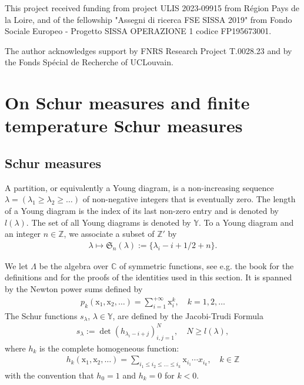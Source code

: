 \documentclass[12pt]{amsart}
\theoremstyle{definition}
\newcommand{\Z}{\mathbb{Z}}
\newcommand{\C}{\mathbb{C}}
\newcommand{\Y}{\mathbb{Y}}
\begin{document}
This project received funding from project ULIS 2023-09915 from R\'egion Pays de la Loire, and of the fellowship "Assegni di ricerca FSE SISSA 2019"  from Fondo Sociale Europeo - Progetto SISSA OPERAZIONE 1 codice FP195673001.

The author acknowledges support by FNRS Research Project T.0028.23 and by the Fonds Sp\'ecial de Recherche of UCLouvain.

\section{On Schur measures and finite temperature Schur measures} \label{section:schur}
\subsection{Schur measures}
A partition, or equivalently a Young diagram, is a non-increasing sequence $\lambda= (\lambda_1 \geq \lambda_2 \geq \dots)$ of non-negative integers that is eventually zero. The length of a Young diagram is the index of its last non-zero entry and is denoted by $l (\lambda)$. The set of all Young diagrams is denoted by $\Y$. To a Young diagram and an integer $n \in \Z$, we associate a subset of $\Z'$ by
\begin{align}
\lambda \mapsto \mathfrak{S}_n(\lambda) := \{ \lambda_i -i +1/2 + n \}.
\end{align}

We let $\Lambda$ be the algebra over $\C$ of symmetric functions, see e.g. the book \cite{macdonald} for the definitions and for the proofs of the identities used in this section. It is spanned by the Newton power sums defined by
\begin{align*}
p_k( \mathrm{x}_1, \mathrm{x}_2, \dots ) = \sum_{ i =1}^{ + \infty} \mathrm{x}_i^k, \quad k=1,2,\dots
\end{align*}
The Schur functions $s_\lambda$, $\lambda \in \Y$, are defined by the Jacobi-Trudi Formula
\begin{align*}
s_\lambda := \det( h_{\lambda_i -i + j} )_{i,j=1}^N, \quad N \geq l(\lambda),
\end{align*}
where $h_k$ is the complete homogeneous function:
\begin{align*}
h_k( \mathrm{x}_1,\mathrm{x}_2,\dots) = \sum_{i_1 \leq i_2 \leq \dots \leq i_k} \mathrm{x}_{i_1} \cdots x_{i_k}, \quad k \in \Z
\end{align*}
with the convention that $h_0 =1$ and $h_k=0$ for $k<0$.\\
\end{document}
